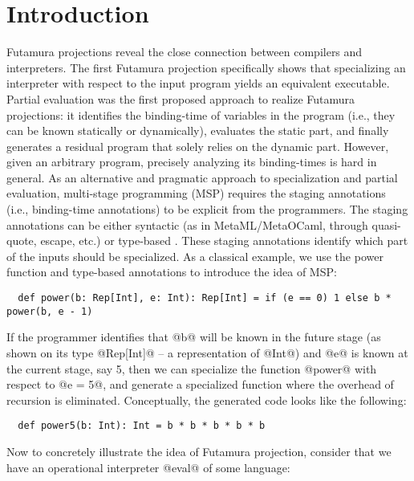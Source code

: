 \section{Introduction} \label{intro}

Futamura projections \cite{Futamura1999, futamura1971partial} reveal the close
connection between compilers and interpreters. The first Futamura projection
specifically shows that specializing an interpreter with respect to the input
program yields an equivalent executable. Partial evaluation
\cite{DBLP:books/daglib/0072559} was the first proposed approach to realize
Futamura projections: it identifies the binding-time of variables in
the program (i.e., they can be known statically or dynamically),
evaluates the static part, and finally generates a residual program that solely
relies on the dynamic part. However, given an arbitrary program, precisely
analyzing its binding-times is hard in general. As an alternative and pragmatic
approach to specialization and partial evaluation, multi-stage programming (MSP) 
\cite{taha1999multi, DBLP:conf/pepm/TahaS97} requires the staging
annotations (i.e., binding-time annotations) to be explicit from the
programmers. The staging annotations can be either syntactic (as in
MetaML/MetaOCaml, through quasi-quote, escape, etc.) or type-based \cite{DBLP:conf/gpce/RompfO10}.
These staging annotations identify which part of the inputs should be
specialized. As a classical example, we use the power function and type-based
annotations to introduce the idea of MSP:

\begin{lstlisting}
  def power(b: Rep[Int], e: Int): Rep[Int] = if (e == 0) 1 else b * power(b, e - 1)
\end{lstlisting}

If the programmer identifies that @b@ will be known in the future stage (as shown
on its type @Rep[Int]@ -- a representation of @Int@) and @e@ is known at the
current stage, say 5, then we can specialize the function @power@ with
respect to @e = 5@, and generate a specialized function where the overhead of
recursion is eliminated. Conceptually, the generated code looks like the following:

\begin{lstlisting}
  def power5(b: Int): Int = b * b * b * b * b
\end{lstlisting}

Now to concretely illustrate the idea of Futamura projection, consider that we
have an operational interpreter @eval@ of some language:

